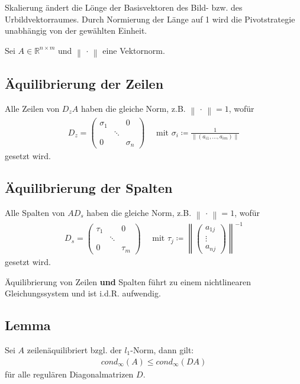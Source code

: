 \documentclass[ngerman,fontsize=11pt, paper=a4, parskip=half, titlepage=true, toc=bib]{scrbook}
\newcommand{\Renm}{\mathds{R}^{n\times m}}
\newcommand{\nn}[1]{\left\| #1 \right\|}
\begin{document}
  Skalierung ändert die Lönge der Basisvektoren des Bild- bzw. des Urbildvektorraumes.
  Durch Normierung der Länge auf 1 wird die Pivotstrategie unabhängig von der 
  gewählten Einheit.
  
    Sei $A\in\Renm $ und $\nn{\,\cdot\,} $ eine Vektornorm.
  
  
  \subsection{Äquilibrierung der Zeilen} 
  Alle Zeilen von $D_zA$ haben die gleiche Norm, z.B. $\nn{\,\cdot\,} =1$, wofür 
  \begin{gather}
  	D_z = \begin{pmatrix}
  	\sigma_1 & & 0 \\
  	&\ddots & \\ 
  	0 && \sigma_n
  	\end{pmatrix}
  	 \quad \text{ mit }\sigma_i\coloneqq \frac{1}{\nn{(a_{i1}, \dots , a_{im})}}
  	 \label{IV.1.1}
  \end{gather}
  gesetzt wird.


  \subsection{Äquilibrierung der Spalten} 
  Alle Spalten von $AD_s$ haben die gleiche Norm, z.B. $\nn{\,\cdot\,} =1$, wofür 
  \begin{gather}
  D_s = \begin{pmatrix}
  \tau_1 & & 0 \\
  &\ddots & \\ 
  0 && \tau_m
  \end{pmatrix}
  \quad \text{ mit }\tau_j\coloneqq \nn{\begin{pmatrix}
  		a_{1j} \\ \vdots \\ a_{nj}
  		\end{pmatrix}}^{-1}
  \label{IV.1.2}
  \end{gather}
  gesetzt wird.
  
  Äquilibrierung von Zeilen \textbf{und} Spalten führt zu einem nichtlinearen Gleichungssystem und ist i.d.R. aufwendig.
  
  
  \subsection{Lemma} \label{4.3.1}
  Sei $A$ zeilenäquilibriert bzgl. der $l_1$-Norm, dann gilt:
  \begin{gather}
  	cond_{\infty}(A) \leq cond_{\infty}(DA)  \label{IV.1.3}
  \end{gather}
  für alle regulären Diagonalmatrizen $D$.
  
\end{document}
